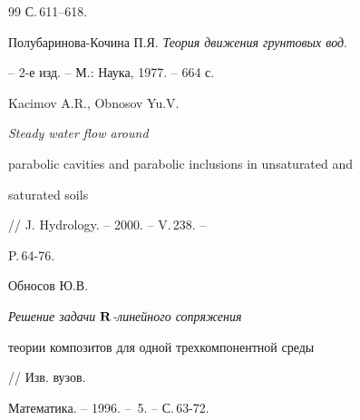 \begin{thebibliography}{99}
С.\,611--618.




Полубаринова-Кочина П.Я. {\em Теория движения грунтовых вод}.


-- 2-е изд. -- М.: Наука, 1977. -- 664 с.




Kacimov A.R., Obnosov Yu.V. {\em Steady water flow around


parabolic cavities and parabolic inclusions in unsaturated and


saturated soils} // J. Hydrology. -- 2000. -- V.\,238. --


P.\,64-76.




Обносов Ю.В. {\em Решение задачи $\bold R$-линейного сопряжения


теории композитов для одной трехкомпонентной среды} // Изв. вузов.


Математика. -- 1996. -- \No\,5. -- С.\,63-72.





\end{thebibliography}





\vskip 2cm












\label{end}





